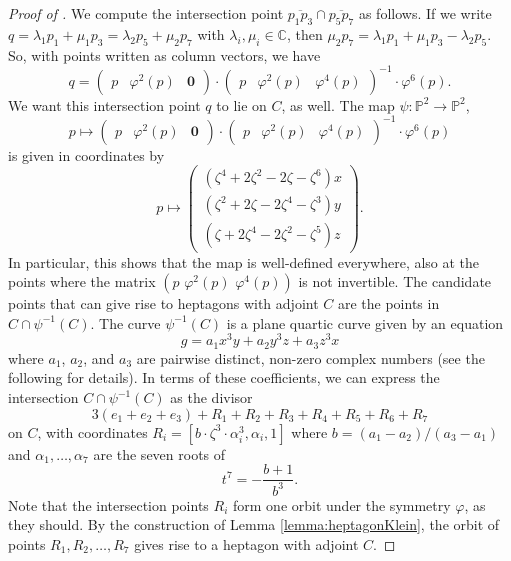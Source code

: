 \documentclass[12pt]{article}
\numberwithin{equation}{section}
\theoremstyle{definition}
\renewcommand{\P}{\mathbb{P}}
\newcommand{\C}{\mathbb{C}}
\newcommand{\ol}{\overline}
\begin{document}
\begin{proof}[{Proof of }]
	We compute the intersection point $\ol{p_1p_3}\cap \ol{p_5p_7}$ as follows. If we write $q = \lambda_1 p_1 + \mu_1 p_3 = \lambda_2 p_5 + \mu_2 p_7$ with $\lambda_i,\mu_i\in \C$, then $\mu_2 p_7 = \lambda_1 p_1 + \mu_1 p_3 - \lambda_2 p_5$. So, with points written as column vectors, we have 
	\[ q=\begin{pmatrix}
	p & \varphi^2(p) & \mathbf{0} 
	\end{pmatrix} \cdot \begin{pmatrix}
	p & \varphi^2(p) & \varphi^4(p) 
	\end{pmatrix}^{-1} \cdot \varphi^6(p).
	\]
	We want this intersection point $q$ to lie on $C$, as well. The map $\psi\colon \P^2 \to \P^2$,
	\[ p \mapsto \begin{pmatrix}
	p & \varphi^2(p) & \mathbf{0} 
	\end{pmatrix} \cdot \begin{pmatrix}
	p & \varphi^2(p) & \varphi^4(p) 
	\end{pmatrix}^{-1} \cdot \varphi^6(p) \]
	is given in coordinates by 
	\[ p \longmapsto 
	\begin{pmatrix} (\zeta^4+2\zeta^2-2\zeta-\zeta^6)x \\ 
	(\zeta^2+2\zeta-2\zeta^4-\zeta^3)y \\
	(\zeta+2\zeta^4-2\zeta^2-\zeta^5)z \end{pmatrix}.
	\]
	In particular, this shows that the map is well-defined everywhere, also at the points where the matrix $(p \,\, \varphi^2(p) \,\, \varphi^4(p))$ is not invertible.
	The candidate points that can give rise to heptagons with adjoint $C$ are the points in $C\cap \psi^{-1}(C)$. The curve $\psi^{-1}(C)$ is a plane quartic curve given by an equation
	\[ g = a_1 x^3 y + a_2 y^3 z+ a_3 z^3 x \]
	where $a_1$, $a_2$, and $a_3$ are pairwise distinct, non-zero complex numbers (see the following  for details). In terms of these coefficients, we can express the intersection $C\cap \psi^{-1}(C)$ as the divisor 
	\[ 3(e_1 + e_2 + e_3) + R_1 + R_2 + R_3 + R_4 + R_5 + R_6 + R_7 \]
	on $C$, with coordinates $R_i = [b \cdot \zeta^3 \cdot \alpha_i^3, \alpha_i,1]$ where $b = (a_1 - a_2)/(a_3-a_1)$ and $\alpha_1,\dots,\alpha_7$ are the seven roots of
	\[ t^7  = - \frac{b+1}{b^3}.\]
	Note that the intersection points $R_i$ form one orbit under the symmetry $\varphi$, as they should. By the construction of Lemma \ref{lemma:heptagonKlein}, the orbit of points $R_1, R_2, \ldots, R_7$ gives rise to a heptagon with adjoint $C$.
	

\end{proof}
\end{document}
